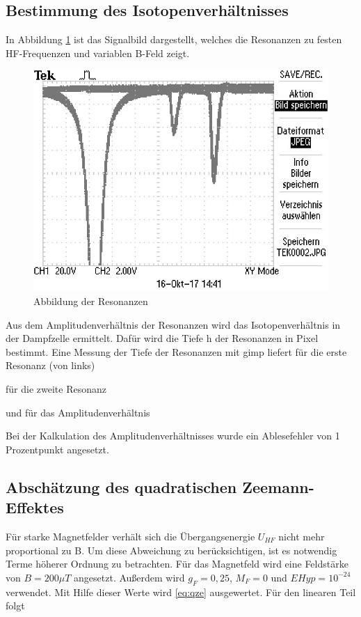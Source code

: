 \subsection{Bestimmung des Isotopenverhältnisses}
In Abbildung \ref{resonanz} ist das Signalbild dargestellt, welches die Resonanzen zu festen
HF-Frequenzen und variablen B-Feld zeigt.

\begin{figure}[h]
\centering
\includegraphics[scale=0.8]{img/TEK0002.JPG}
\caption{Abbildung der Resonanzen}
\label{resonanz}
\end{figure}


Aus dem Amplitudenverhältnis der Resonanzen wird das Isotopenverhältnis in der
Dampfzelle ermittelt. Dafür wird die Tiefe h der Resonanzen in Pixel bestimmt.
Eine Messung der Tiefe der Resonanzen mit gimp liefert für die erste Resonanz (von links)



für die zweite Resonanz



und für das Amplitudenverhältnis



Bei der Kalkulation des Amplitudenverhältnisses wurde ein Ablesefehler von 1 Prozentpunkt
angesetzt.

\subsection{Abschätzung des quadratischen Zeemann-Effektes}
Für starke Magnetfelder verhält sich die Übergangsenergie $U_{HF}$ nicht mehr proportional zu B. Um diese Abweichung zu berücksichtigen, ist es notwendig Terme höherer Ordnung zu betrachten.
Für das Magnetfeld wird eine Feldstärke von $B = 200 \mu T$ angesetzt. Außerdem wird $g_F = 0,25$, $M_F = 0$ und $EHyp = 10^{-24}$ \cite{FP} verwendet. Mit Hilfe dieser Werte wird \ref{eq:qze} ausgewertet.
Für den linearen Teil folgt

